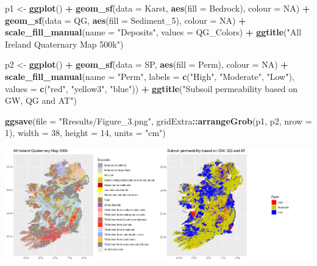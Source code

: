 \documentclass[
  12pt,
]{article}
\newenvironment{Shaded}{\begin{snugshade}}{\end{snugshade}}
\newcommand{\DataTypeTok}[1]{\textcolor[rgb]{0.13,0.29,0.53}{#1}}
\newcommand{\DecValTok}[1]{\textcolor[rgb]{0.00,0.00,0.81}{#1}}
\newcommand{\KeywordTok}[1]{\textcolor[rgb]{0.13,0.29,0.53}{\textbf{#1}}}
\newcommand{\NormalTok}[1]{#1}
\newcommand{\OperatorTok}[1]{\textcolor[rgb]{0.81,0.36,0.00}{\textbf{#1}}}
\newcommand{\OtherTok}[1]{\textcolor[rgb]{0.56,0.35,0.01}{#1}}
\newcommand{\StringTok}[1]{\textcolor[rgb]{0.31,0.60,0.02}{#1}}
\begin{document}
\begin{Shaded}
\begin{Highlighting}[]
\NormalTok{  p1 \textless{}{-}}\StringTok{ }\KeywordTok{ggplot}\NormalTok{() }\OperatorTok{+}
\StringTok{    }\KeywordTok{geom\_sf}\NormalTok{(}\DataTypeTok{data =}\NormalTok{ Karst, }\KeywordTok{aes}\NormalTok{(}\DataTypeTok{fill =}\NormalTok{ Bedrock), }\DataTypeTok{colour =} \OtherTok{NA}\NormalTok{) }\OperatorTok{+}
\StringTok{    }\KeywordTok{geom\_sf}\NormalTok{(}\DataTypeTok{data =}\NormalTok{ QG, }\KeywordTok{aes}\NormalTok{(}\DataTypeTok{fill =}\NormalTok{ Sediment\_}\DecValTok{5}\NormalTok{), }\DataTypeTok{colour =} \OtherTok{NA}\NormalTok{) }\OperatorTok{+}
\StringTok{    }\KeywordTok{scale\_fill\_manual}\NormalTok{(}\DataTypeTok{name =} \StringTok{"Deposits"}\NormalTok{, }\DataTypeTok{values =}\NormalTok{ QG\_Colors) }\OperatorTok{+}
\StringTok{    }\KeywordTok{ggtitle}\NormalTok{(}\StringTok{"All Ireland Quaternary Map 500k"}\NormalTok{) }

\NormalTok{  p2 \textless{}{-}}\StringTok{ }\KeywordTok{ggplot}\NormalTok{() }\OperatorTok{+}
\StringTok{    }\KeywordTok{geom\_sf}\NormalTok{(}\DataTypeTok{data =}\NormalTok{ SP, }\KeywordTok{aes}\NormalTok{(}\DataTypeTok{fill =}\NormalTok{ Perm), }\DataTypeTok{colour =} \OtherTok{NA}\NormalTok{) }\OperatorTok{+}
\StringTok{    }\KeywordTok{scale\_fill\_manual}\NormalTok{(}\DataTypeTok{name =} \StringTok{"Perm"}\NormalTok{, }
                      \DataTypeTok{labels =} \KeywordTok{c}\NormalTok{(}\StringTok{"High"}\NormalTok{, }\StringTok{"Moderate"}\NormalTok{, }\StringTok{"Low"}\NormalTok{),}
                      \DataTypeTok{values =} \KeywordTok{c}\NormalTok{(}\StringTok{"red"}\NormalTok{, }\StringTok{"yellow3"}\NormalTok{, }\StringTok{"blue"}\NormalTok{)) }\OperatorTok{+}
\StringTok{    }\KeywordTok{ggtitle}\NormalTok{(}\StringTok{"Subsoil permeability based on GW, QG and AT"}\NormalTok{) }

  \KeywordTok{ggsave}\NormalTok{(}\DataTypeTok{file =} \StringTok{"Rresults/Figure\_3.png"}\NormalTok{,}
\NormalTok{         gridExtra}\OperatorTok{::}\KeywordTok{arrangeGrob}\NormalTok{(p1, p2, }\DataTypeTok{nrow =} \DecValTok{1}\NormalTok{),}
       \DataTypeTok{width =} \DecValTok{38}\NormalTok{,}
       \DataTypeTok{height =} \DecValTok{14}\NormalTok{,}
       \DataTypeTok{units =} \StringTok{"cm"}\NormalTok{)}
\end{Highlighting}
\end{Shaded}

\begin{center}\includegraphics[width=1\linewidth]{Rresults/Figure_3} \end{center}
\end{document}
